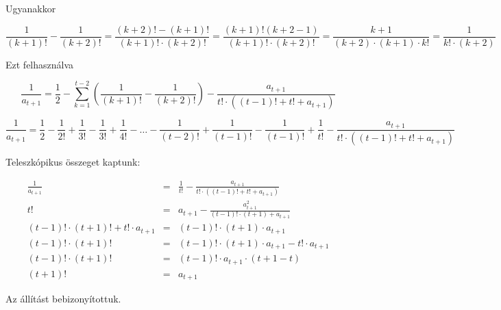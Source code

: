 \documentclass[a4paper,10pt]{article}
\begin{document}
Ugyanakkor

$$\frac{1}{(k+1)!}-\frac{1}{(k+2)!}=
\frac{(k+2)!-(k+1)!}{(k+1)!\cdot(k+2)!}=
\frac{(k+1)!(k+2-1)}{(k+1)!\cdot(k+2)!}=
\frac{k+1}{(k+2)\cdot(k+1)\cdot k!}=
\frac{1}{k!\cdot (k+2)}
$$

Ezt felhasználva

$$\frac{1}{a_{t+1}}=\frac{1}{2}-\sum_{k=1}^{t-2}
\left(\frac{1}{(k+1)!}-\frac{1}{(k+2)!}\right)-\frac{a_{t+1}}{t!\cdot((t-1)!+t!+a_{t+1})}$$

$$\frac{1}{a_{t+1}} =
\frac{1}{2}-\frac{1}{2!}+\frac{1}{3!}-\frac{1}{3!}+\frac{1}{4!}-
\ldots 
-\frac{1}{(t-2)!}+\frac{1}{(t-1)!}-\frac{1}{(t-1)!}+\frac{1}{t!}
-\frac{a_{t+1}}{t!\cdot((t-1)!+t!+a_{t+1})}
$$

Teleszkópikus összeget kaptunk:

\begin{eqnarray*}
\frac{1}{a_{t+1}}&=&\frac{1}{t!}-\frac{a_{t+1}}{t!\cdot((t-1)!+t!+a_{t+1})}\\
t!&=&a_{t+1}-\frac{a_{t+1}^2}{(t-1)!\cdot(t+1)+a_{t+1}}\\
(t-1)!\cdot(t+1)!+t!\cdot a_{t+1} &=&(t-1)!\cdot(t+1)\cdot a_{t+1}\\
(t-1)!\cdot(t+1)! &=&(t-1)!\cdot(t+1)\cdot a_{t+1}-t!\cdot a_{t+1}\\
(t-1)!\cdot(t+1)! &=&(t-1)!\cdot a_{t+1}\cdot (t+1-t)\\
(t+1)! &=& a_{t+1}
\end{eqnarray*}

Az állítást bebizonyítottuk.

\vfill
\end{document}
